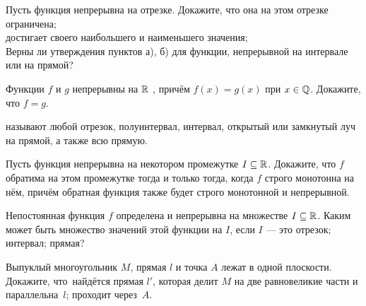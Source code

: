\documentclass[a4paper,12pt]{article}
\begin{document}
%
%
%



 Пусть функция непрерывна на отрезке. Докажите, что она
на этом отрезке
\\ ограничена;
\\ достигает своего наибольшего и наименьшего значения;
\\ Верны ли утверждения пунктов а), б) для функции, непрерывной
на интервале или на прямой?


Функции $f$ и $g$ непрерывны на $\mathbb{R}$ , причём $f(x)=g(x)$ при $x\in\mathbb{Q}$.
Докажите, что $f=g$.

  называют любой
отрезок, полуинтервал, интервал, открытый или замкнутый луч на прямой,
а также всю прямую.

Пусть функция непрерывна на некотором промежутке $I\subseteq \mathbb{R}$.
Докажите, что $f$ обратима на этом промежутке тогда и только тогда,
когда $f$ строго монотонна на нём, причём обратная функция также будет строго
монотонной и непрерывной.


Непостоянная функция $f$ определена и непрерывна на множестве
$I\subseteq\mathbb{R}$.  Каким может быть множество значений этой функции
на $I$, если $I$ --- это
отрезок;
интервал;
прямая?

 Выпуклый многоугольник $M$, прямая $l$ и точка $A$ лежат в одной
плоскости. Докажите, что~найдётся прямая $l'$, которая
делит $M$ на две равновеликие части и
 параллельна~$l$;
 проходит через~$A$.
\end{document}
